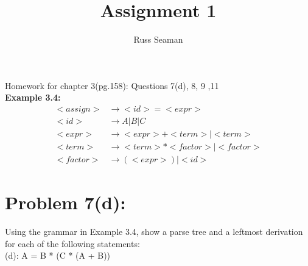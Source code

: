 \documentclass[]{article}
\title{Assignment 1}
\author{Russ Seaman}
\begin{document}
\raggedright
\maketitle
Homework for chapter 3(pg.158): Questions 7(d), 8, 9 ,11\\
\textbf{Example 3.4:}
\begin{equation*} \label{e34}
\begin{split}
<assign> & \rightarrow <id> = <expr>\\
<id> & \rightarrow A | B | C\\
<expr> & \rightarrow <expr> + <term> | <term>\\
<term> & \rightarrow <term> * <factor> | <factor>\\
<factor> & \rightarrow ( <expr> )  | <id>
\end{split}
\end{equation*}

\section*{Problem 7(d):}
Using the grammar in Example 3.4, show a parse tree and a leftmost derivation for each of the following statements:\\
(d): A = B * (C * (A + B))
\end{document}
